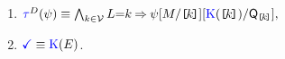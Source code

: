 \begin{minipage}[t]{.56\textwidth}
  \begin{enumerate}[resume,topsep=0pt,label=(\textsc{w}\arabic*),ref=\textsc{w}\arabic*]
  \item \label{write-tau-addr}
    \begin{math}
      \aTr{\bEvs}{\bForm} \riff 
      \textstyle\bigwedge_{\dVal\in\Val}
      \cExp{=}\dVal
      \limplies
        \bForm
        [\aExp/\REF{\dVal}]
        [\kappaE{\REF{\dVal}}/\Q{\REF{\dVal}}],
      \end{math}
  \item \label{write-term-addr}
    $\aTerm \riff \kappaE{}$.
  \end{enumerate}
\end{minipage}

